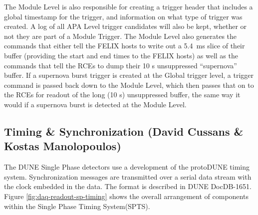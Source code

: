 	The Module Level is also responsible for creating a trigger header that
includes a global timestamp for the trigger, and information on what type of
trigger was created. A log of all APA Level trigger candidates will also be
kept, whether or not they are part of a Module Trigger. The Module Level also
generates the commands that either tell the FELIX hosts to write out a 5.4~ms
slice of their buffer (providing the start and end times to the FELIX hosts)
as well as the commands that tell the RCEs to dump their 10 s unsuppressed
``supernova'' buffer.  If a supernova burst trigger is created at the Global
trigger level, a trigger command is passed back down to the Module Level, which
then passes that on to the RCEs for readout of the long (10 s) unsuppressed
buffer, the same way it would if a supernova burst is detected at the Module
Level. 

	


%

%
%
%

\subsection{Timing \& Synchronization (David Cussans \& Kostas Manolopoulos)}
\label{sec:fdsp-daq-timing}


The DUNE Single Phase detectors use a development of the protoDUNE timing system. Synchronization messages are transmitted over a serial data stream with the clock embedded in the data. The format is described in DUNE DocDB-1651. Figure \ref{fig:daq-readout-sp-timing} shows the overall arrangement of components within the Single Phase Timing System(SPTS).

